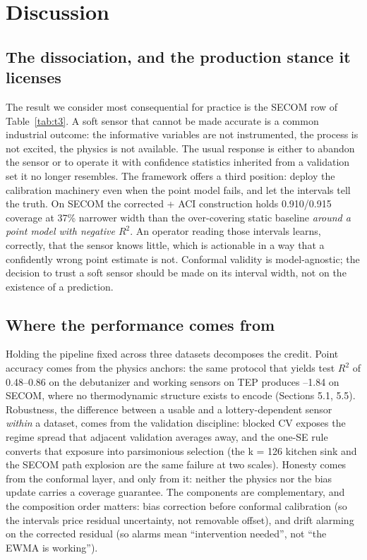 \section{Discussion}
\label{sec:discussion}

\subsection{The dissociation, and the production stance it licenses}

The result we consider most consequential for practice is the SECOM row of Table~\ref{tab:t3}.
A soft sensor that cannot be made accurate is a common industrial outcome: the
informative variables are not instrumented, the process is not excited, the physics is
not available. The usual response is either to abandon the sensor or to operate it
with confidence statistics inherited from a validation set it no longer resembles. The
framework offers a third position: deploy the calibration machinery even when the
point model fails, and let the intervals tell the truth. On SECOM the corrected + ACI
construction holds 0.910/0.915 coverage at 37\% narrower width than the over-covering
static baseline \emph{around a point model with negative $R^2$}. An operator reading those
intervals learns, correctly, that the sensor knows little, which is actionable in a
way that a confidently wrong point estimate is not. Conformal validity is
model-agnostic; the decision to trust a soft sensor should be made on its interval
width, not on the existence of a prediction.

\subsection{Where the performance comes from}

Holding the pipeline fixed across three datasets decomposes the credit. Point accuracy
comes from the physics anchors: the same protocol that yields test $R^2$ of 0.48--0.86 on
the debutanizer and working sensors on TEP produces --1.84 on SECOM, where no
thermodynamic structure exists to encode (Sections 5.1, 5.5). Robustness, the
difference between a usable and a lottery-dependent sensor \emph{within} a dataset, comes
from the validation discipline: blocked CV exposes the regime spread that adjacent
validation averages away, and the one-SE rule converts that exposure into parsimonious
selection (the k = 126 kitchen sink and the SECOM path explosion are the same failure
at two scales). Honesty comes from the conformal layer, and only from it: neither the
physics nor the bias update carries a coverage guarantee. The components are
complementary, and the composition order matters: bias correction before conformal
calibration (so the intervals price residual uncertainty, not removable offset), and
drift alarming on the corrected residual (so alarms mean ``intervention needed'', not
``the EWMA is working'').

